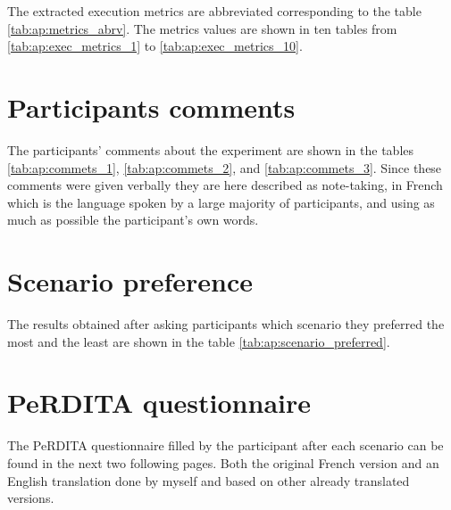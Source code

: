 The extracted execution metrics are abbreviated corresponding to the table \ref{tab:ap:metrics_abrv}. The metrics values are shown in ten tables from \ref{tab:ap:exec_metrics_1} to \ref{tab:ap:exec_metrics_10}. 


\section{Participants comments}

The participants' comments about the experiment are shown in the tables \ref{tab:ap:commets_1}, \ref{tab:ap:commets_2}, and \ref{tab:ap:commets_3}. Since these comments were given verbally they are here described as note-taking, in French which is the language spoken by a large majority of participants, and using as much as possible the participant's own words.

\section{Scenario preference}

The results obtained after asking participants which scenario they preferred the most and the least are shown in the table \ref{tab:ap:scenario_preferred}. 

\section{PeRDITA questionnaire}

The PeRDITA questionnaire filled by the participant after each scenario can be found in the next two following pages. Both the original French version and an English translation done by myself and based on other already translated versions. 




